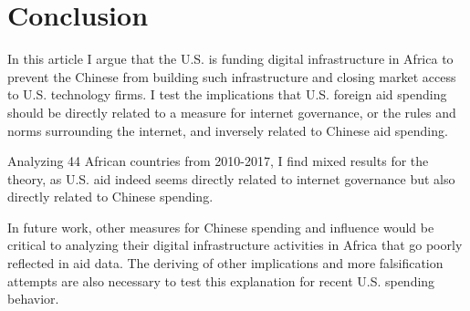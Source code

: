 \documentclass[12pt]{article}
\begin{document}
\section*{Conclusion}
In this article I argue that the U.S. is funding digital infrastructure in Africa to prevent the Chinese from building such infrastructure and closing market access to U.S. technology firms. I test the implications that U.S. foreign aid spending should be directly related to a measure for internet governance, or the rules and norms surrounding the internet, and inversely related to Chinese aid spending.

Analyzing 44 African countries from 2010-2017, I find mixed results for the theory, as U.S. aid indeed seems directly related to internet governance but also directly related to Chinese spending.

In future work, other measures for Chinese spending and influence would be critical to analyzing their digital infrastructure activities in Africa that go poorly reflected in aid data. The deriving of other implications and more falsification attempts are also necessary to test this explanation for recent U.S. spending behavior. 

\nocite{mechkova2022a}
\nocite{pemstein2022}
\nocite{coppedge2022}
\nocite{coppedge2022a}
\nocite{coppedge2022b}
\nocite{coppedge2022c}
\nocite{coppedge2022d}
\nocite{curini2020}
\pagebreak
\printbibliography
\end{document}
